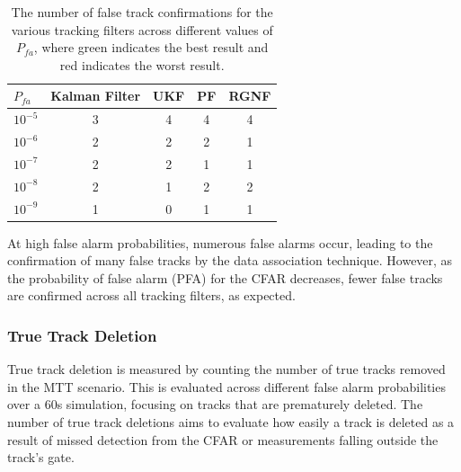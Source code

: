 \begin{table}[H]
    \centering
    \begin{tabular}{l c c c c}
        \toprule
        \textbf{\(P_{fa}\)} & \textbf{Kalman Filter} & \textbf{UKF} & \textbf{PF} & \textbf{RGNF} \\
        \midrule
        \(10^{-5}\) & 3                     & \cellcolor{worstcell}4 & \cellcolor{worstcell}4 & \cellcolor{worstcell}4 \\
        \(10^{-6}\) & 2                     & 2                      & 2                      & 1 \\
        \(10^{-7}\) & 2                     & 2                      & 1                      & 1 \\
        \(10^{-8}\) & 2                     & 1                      & 2                      & 2 \\
        \(10^{-9}\) & 1                     & \cellcolor{bestcell}0  & 1                      & 1 \\
        \bottomrule
    \end{tabular}
    \caption{The number of false track confirmations for the various tracking filters across
             different values of \(P_{fa}\), where green indicates
             the best result and red indicates the worst result.}
    \label{tab:Pft}
\end{table}

At high false alarm probabilities, numerous false alarms occur, leading to the confirmation of many false tracks by the data association technique. However, as the probability of false alarm (PFA) for the \ac{CFAR} decreases, fewer false tracks are confirmed across all tracking filters, as expected.

\subsubsection{True Track Deletion}
True track deletion is measured by counting the number of true tracks removed in the \ac{MTT} scenario. This is evaluated across different false alarm probabilities over a 60s simulation, focusing on tracks that are prematurely deleted. The number of true track deletions aims to evaluate how easily a track is deleted as a result of missed detection from the \ac{CFAR} or measurements falling outside the track's gate.

